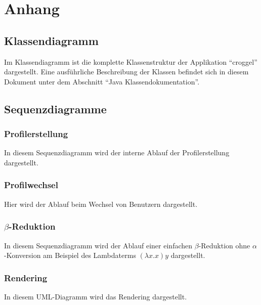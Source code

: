 \chapter{Anhang}
\section{Klassendiagramm}
	Im Klassendiagramm ist die komplette Klassenstruktur der Applikation "`croggel"' dargestellt. 
	Eine ausführliche Beschreibung der Klassen befindet sich in diesem Dokument unter dem Abschnitt "`Java Klassendokumentation"'. 

\section{Sequenzdiagramme}
	\subsection{Profilerstellung}
		In diesem Sequenzdiagramm wird der interne Ablauf der Profilerstellung dargestellt.

	\subsection{Profilwechsel}
		Hier wird der Ablauf beim Wechsel von Benutzern dargestellt.

	\subsection{\(\beta\)-Reduktion}
		In diesem Sequenzdiagramm wird der Ablauf einer einfachen \(\beta\)-Reduktion ohne \(\alpha\)-Konversion am Beispiel des Lambdaterms \((\lambda x.x) y\) dargestellt.

	\subsection{Rendering}
		In diesem UML-Diagramm wird das Rendering dargestellt.
